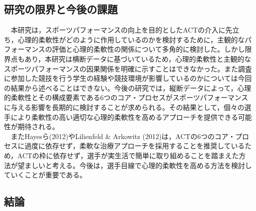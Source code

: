\documentclass[12pt,a4paper,xelatex,ja=standard]{bxjsarticle}
\begin{document}
\hypertarget{ux7814ux7a76ux306eux9650ux754cux3068ux4ecaux5f8cux306eux8ab2ux984c}{%
\subsection{研究の限界と今後の課題}\label{ux7814ux7a76ux306eux9650ux754cux3068ux4ecaux5f8cux306eux8ab2ux984c}}

　本研究は，スポーツパフォーマンスの向上を目的としたACTの介入に先立ち，心理的柔軟性がどのように作用しているのかを検討するために，主観的なパフォーマンスの評価と心理的柔軟性の関係について多角的に検討した。しかし限界点もあり，本研究は横断データに基づいているため，心理的柔軟性と主観的なスポーツパフォーマンスの因果関係を明確に示すことはできなかった。また調査に参加した競技を行う学生の経験や競技環境が影響しているのかについては今回の結果から述べることはできない。今後の研究では，縦断データによって，心理的柔軟性とその構成要素である6つのコア・プロセスがスポーツパフォーマンスに与える影響を長期的に検討することが求められる。その結果として，個々の選手により柔軟性の高い適切な心理的柔軟性を高めるアプローチを提供できる可能性が期待される。\\
　またHayesら(2012)やLilienfeld \& Arkowitz
(2012)は，ACTの6つのコア・プロセスに過度に依存せず，柔軟な治療アプローチを採用することを推奨しているため，ACTの枠に依存せず，選手が実生活で簡単に取り組めることを踏まえた方法が望ましいと考える。今後は，選手目線で心理的柔軟性を高める方法を検討していくことが重要である。

\hypertarget{ux7d50ux8ad6}{%
\subsection{結論}\label{ux7d50ux8ad6}}
\end{document}
